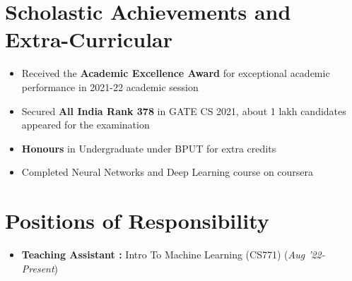 \documentclass[10.8pt, a4paper]{extarticle}
\newcommand{\shorterSection}[1]{\vspace{-10pt}\section{#1}}
\begin{document}

\shorterSection{Scholastic Achievements and Extra-Curricular}
\begin{itemize}
  \item Received the \textbf{Academic Excellence Award} for exceptional academic performance in 2021-22 academic session\\[-0.6cm]
  \item Secured \textbf{All India Rank 378} in GATE CS 2021, about 1 lakh candidates appeared for the examination\\[-0.6cm]
  \item \textbf{Honours} in Undergraduate under BPUT for extra credits\\[-0.6cm]
  \item Completed Neural Networks and Deep Learning course on coursera
\end{itemize}
\medskip


\shorterSection{Positions of Responsibility}
\begin{itemize}
\item \textbf{Teaching Assistant :} Intro To Machine Learning (CS771) \hfill\hfill(\textit{Aug '22-Present})
\vspace{2mm}
\end{itemize}
\vspace{-2mm}
\end{document}
